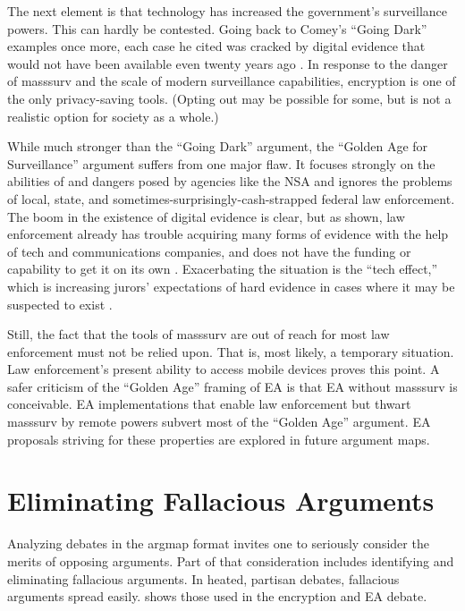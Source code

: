 The next element is that technology has increased the government's surveillance powers. This can hardly be contested.
Going back to Comey's ``Going Dark'' examples once more, each case he cited was cracked by digital evidence that would
not have been available even twenty years ago \cite{comey_2014}. In response to the danger of \ac{masssurv} and the
scale of modern surveillance capabilities, encryption is one of the only privacy-saving tools. (Opting out may be
possible for some, but is not a realistic option for society as a whole.)

While much stronger than the ``Going Dark'' argument, the ``Golden Age for Surveillance'' argument suffers from one
major flaw. It focuses strongly on the abilities of and dangers posed by agencies like the \ac{NSA} and ignores the
problems of local, state, and sometimes-surprisingly-cash-strapped federal law enforcement. The boom in the existence of
digital evidence is clear, but as shown, law enforcement already has trouble acquiring many forms of evidence with the
help of tech and communications companies, and does not have the funding or capability to get it on its own
\cite{carter_2018}. Exacerbating the situation is the ``tech effect,'' which is increasing jurors' expectations of hard
evidence in cases where it may be suspected to exist \cite{shelton_study_2006}.

Still, the fact that the tools of \ac{masssurv} are out of reach for most law enforcement must not be relied upon. That
is, most likely, a temporary situation. Law enforcement's present ability to access mobile devices proves this point. A
safer criticism of the ``Golden Age'' framing of \ac{EA} is that \ac{EA} without \ac{masssurv} is conceivable. \ac{EA}
implementations that enable law enforcement but thwart \ac{masssurv} by remote powers subvert most of the ``Golden Age''
argument. \ac{EA} proposals striving for these properties are explored in future argument maps.


\section{Eliminating Fallacious Arguments}

Analyzing debates in the \ac{argmap} format invites one to seriously consider the merits of opposing arguments. Part of
that consideration includes identifying and eliminating fallacious arguments. In heated, partisan debates, fallacious
arguments spread easily.  shows those used in the encryption and \ac{EA} debate.

